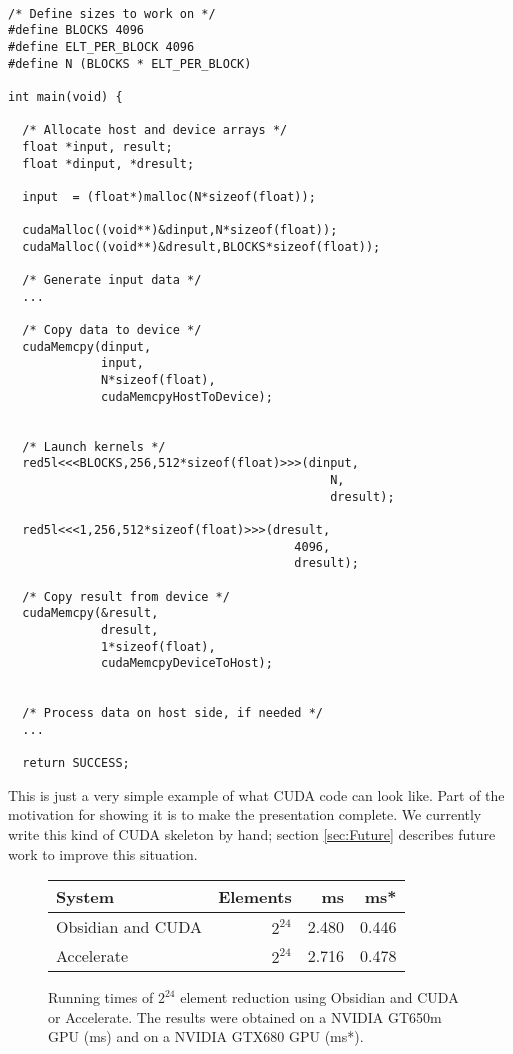 
\begin{small}
\begin{Verbatim}[samepage=true] 

/* Define sizes to work on */ 
#define BLOCKS 4096
#define ELT_PER_BLOCK 4096
#define N (BLOCKS * ELT_PER_BLOCK)

int main(void) {
  
  /* Allocate host and device arrays */ 
  float *input, result; 
  float *dinput, *dresult; 
   
  input  = (float*)malloc(N*sizeof(float));
 
  cudaMalloc((void**)&dinput,N*sizeof(float));
  cudaMalloc((void**)&dresult,BLOCKS*sizeof(float));

  /* Generate input data */
  ... 

  /* Copy data to device */
  cudaMemcpy(dinput,
             input,
             N*sizeof(float),
             cudaMemcpyHostToDevice);

  
  /* Launch kernels */ 
  red5l<<<BLOCKS,256,512*sizeof(float)>>>(dinput,
                                             N,
                                             dresult);
  
  red5l<<<1,256,512*sizeof(float)>>>(dresult,
                                        4096,
                                        dresult); 

  /* Copy result from device */ 
  cudaMemcpy(&result,
             dresult,
             1*sizeof(float),
             cudaMemcpyDeviceToHost);

  
  /* Process data on host side, if needed */
  ... 

  return SUCCESS; 
\end{Verbatim} 
\end{small}

This is just a very simple example of what CUDA code can look like. Part of 
the motivation for showing it is to make the presentation complete. 
We currently write this kind of CUDA skeleton by hand; section \ref{sec:Future} 
describes future work to improve this situation. 


\begin{figure}
\centering 
\begin{small}
\begin{tabular}{| l | r | r | r | }
\hline 
  System            & Elements & ms     & ms*   \\ \hline 
  Obsidian and CUDA & $2^{24}$  & 2.480  & 0.446 \\ \hline
  Accelerate        & $2^{24}$  & 2.716  & 0.478 \\ \hline
\end{tabular}
\caption{Running times of $2^{24}$ element reduction using Obsidian and CUDA 
or Accelerate. The results were obtained on a NVIDIA GT650m GPU (ms) 
and on a NVIDIA GTX680 GPU (ms*).}

\label{fig:CUDATABLE} 
\end{small}
\end{figure}

